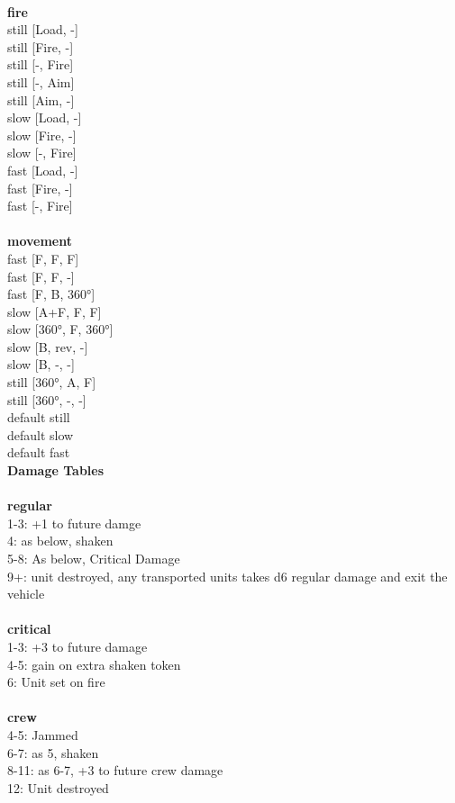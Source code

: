 \ \\ {\bf fire } \\
still [Load, -] \\
still [Fire, -] \\
still [-, Fire] \\
still [-, Aim] \\
still [Aim, -] \\
slow [Load, -] \\
slow [Fire, -] \\
slow [-, Fire] \\
fast [Load, -] \\
fast [Fire, -] \\
fast [-, Fire] \\
\ \\ {\bf movement } \\
fast [F, F, F] \\
fast [F, F, -] \\
fast [F, B, 360°] \\
slow [A+F, F, F] \\
slow [360°, F, 360°] \\
slow [B, rev, -] \\
slow [B, -, -] \\
still [360°, A, F] \\
still [360°, -, -] \\
default still \\
default slow \\
default fast \\


{\bf Damage Tables} \\
\ \\ {\bf regular } \\
1-3: +1 to future damge \\
4: as below, shaken \\
5-8: As below, Critical Damage \\
9+: unit destroyed, any transported units takes d6 regular damage and exit the vehicle \\
\ \\ {\bf critical } \\
1-3: +3 to future damage \\
4-5: gain on extra shaken token \\
6: Unit set on fire \\
\ \\ {\bf crew } \\
4-5: Jammed \\
6-7: as 5, shaken \\
8-11: as 6-7, +3 to future crew damage \\
12: Unit destroyed \\










